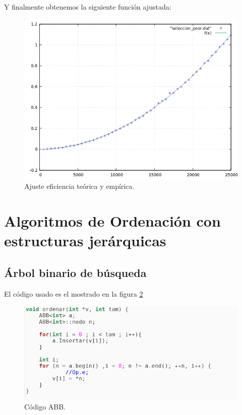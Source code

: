 Y finalmente obtenemos la siguiente función ajustada:
\begin{figure}[H]
    \begin{center}
        \includegraphics[scale=0.7]{imagenes/s_adj.png}
        \caption{Ajuste eficiencia teórica y empírica.}
        \label{fig9}
    \end{center}
\end{figure}



\section{Algoritmos de Ordenación con estructuras jerárquicas}

\subsection{Árbol binario de búsqueda}
El código usado es el mostrado en la figura  \ref{fig18}

\begin{figure}[H]
        \includegraphics[scale=0.7]{imagenes/abb.png}
        \caption{Código ABB.}
        \label{fig18}
\end{figure}

